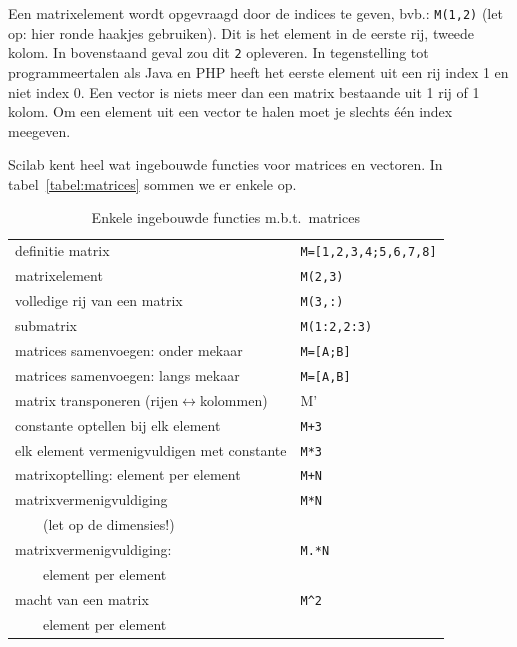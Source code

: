 Een matrixelement wordt opgevraagd door de indices te geven, bvb.: \verb+M(1,2)+ (let op: hier ronde haakjes gebruiken). Dit is het element in de eerste rij, tweede kolom. In bovenstaand geval zou dit \verb+2+ opleveren. In tegenstelling tot programmeertalen als Java en PHP heeft het eerste element uit een rij index 1 en niet index 0. 
Een vector is niets meer dan een matrix bestaande uit 1 rij of 1 kolom. Om een element uit een vector te halen moet je slechts \'e\'en index meegeven.

Scilab kent heel wat ingebouwde functies voor matrices en vectoren. In tabel~\ref{tabel:matrices} sommen we er enkele op.

\begin{table}[h] \small
\centering
\caption{Enkele ingebouwde functies m.b.t.\ matrices}
\begin{tabular}{p{}p{}}
\toprule

definitie matrix    &   \verb+M=[1,2,3,4;5,6,7,8]+ \\

matrixelement       &   \verb+M(2,3)+\\

volledige rij van een matrix    & \verb+M(3,:)+\\

submatrix           & \verb+M(1:2,2:3)+\\

matrices samenvoegen: onder mekaar            & \verb+M=[A;B]+\\
matrices samenvoegen: langs mekaar            &\verb+M=[A,B]+\\
matrix transponeren (rijen$\leftrightarrow$kolommen) & M'\\

constante optellen bij elk element & \verb/M+3/ \\

elk element vermenigvuldigen met constante & \verb+M*3+ \\

matrixoptelling: element per element	& \verb/M+N/\\

matrixvermenigvuldiging 	& \verb/M*N/\\
$\qquad$(let op de dimensies!)&\\

matrixvermenigvuldiging: 	& \verb/M.*N/\\
$\qquad$element per element&\\

macht van een matrix	& \verb/M^2/\\
$\qquad$element per element&\\


\end{tabular}
\end{table}

